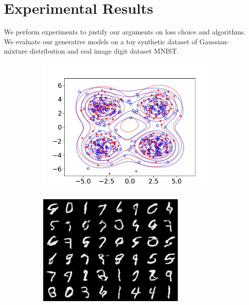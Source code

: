 \section{Experimental Results}
We perform experiments to justify our arguments on loss choice and algorithms. We evaluate our
generative models on a toy synthetic dataset of Gaussian-mixture distribution and real image digit dataset MNIST.
\begin{figure}[!ht]
  \captionsetup[subfigure]{justification=centering}
  \centering
  \begin{subfigure}[b]{0.44\textwidth}
    \centering
    \includegraphics[width=1\linewidth]{images/toy/gauss4/frame8.jpg}
    \caption{}
    \label{fig-toy}
  \end{subfigure}
  \centering
  \begin{subfigure}[b]{0.44\textwidth}
    \centering
    \includegraphics[width=0.8\linewidth]{images/mnist/fake/eot_18500_crop.png}\vspace{5pt}

\end{subfigure}
\end{figure}
